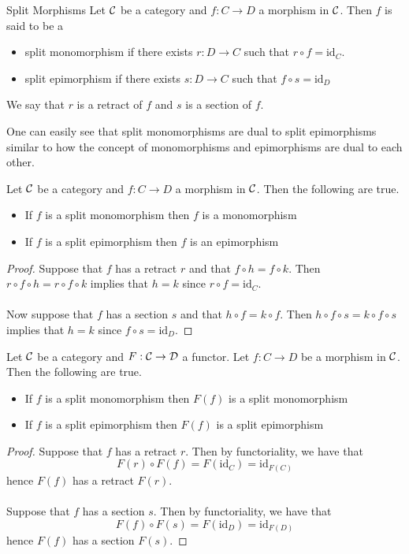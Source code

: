 \documentclass[a4paper]{article}
\begin{document}
\begin{defn}{Split Morphisms}{} Let $\mathcal{C}$ be a category and $f:C\to D$ a morphism in $\mathcal{C}$. Then $f$ is said to be a 
\begin{itemize}
\item split monomorphism if there exists $r:D\to C$ such that $r\circ f=\text{id}_C$. 
\item split epimorphism if there exists $s:D\to C$ such that $f\circ s=\text{id}_D$
\end{itemize}
We say that $r$ is a retract of $f$ and $s$ is a section of $f$. 
\end{defn}

One can easily see that split monomorphisms are dual to split epimorphisms similar to how the concept of monomorphisms and epimorphisms are dual to each other. 

\begin{prp}{}{} Let $\mathcal{C}$ be a category and $f:C\to D$ a morphism in $\mathcal{C}$. Then the following are true. 
\begin{itemize}
\item If $f$ is a split monomorphism then $f$ is a monomorphism
\item If $f$ is a split epimorphism then $f$ is an epimorphism
\end{itemize} \tcbline
\begin{proof}
Suppose that $f$ has a retract $r$ and that $f\circ h=f\circ k$. Then $r\circ f\circ h=r\circ f\circ k$ implies that $h=k$ since $r\circ f=\text{id}_C$. \\~\\

Now suppose that $f$ has a section $s$ and that $h\circ f=k\circ f$. Then $h\circ f\circ s=k\circ f\circ s$ implies that $h=k$ since $f\circ s=\text{id}_D$. 
\end{proof}
\end{prp}

\begin{prp}{}{} Let $\mathcal{C}$ be a category and $F:\mathcal{C}\to\mathcal{D}$ a functor. Let $f:C\to D$ be a morphism in $\mathcal{C}$. Then the following are true. 
\begin{itemize}
\item If $f$ is a split monomorphism then $F(f)$ is a split monomorphism
\item If $f$ is a split epimorphism then $F(f)$ is a split epimorphism
\end{itemize} \tcbline
\begin{proof}
Suppose that $f$ has a retract $r$. Then by functoriality, we have that $$F(r)\circ F(f)=F(\text{id}_C)=\text{id}_{F(C)}$$ hence $F(f)$ has a retract $F(r)$. \\~\\

Suppose that $f$ has a section $s$. Then by functoriality, we have that $$F(f)\circ F(s)=F(\text{id}_D)=\text{id}_{F(D)}$$ hence $F(f)$ has a section $F(s)$. 
\end{proof}
\end{prp}
\end{document}
